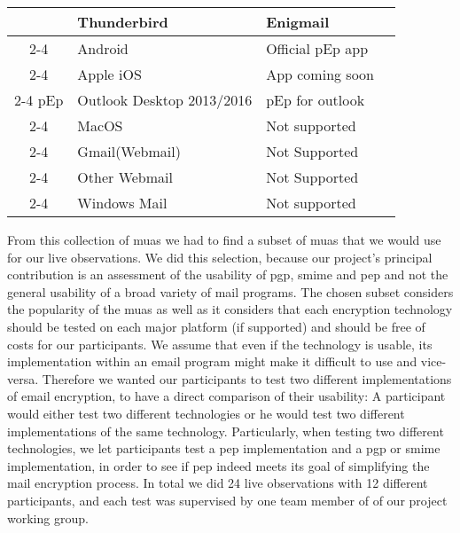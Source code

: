 {\begin{table*}
\begin{tabular}{|c|l|l|c|}
								& Thunderbird					& Enigmail						& \cmark	\\ \cline{2-4}
								& Android						& Official pEp app				& \cmark 	\\ \cline{2-4}
								& Apple iOS						& App coming soon				& \xmark	\\ \cline{2-4}
		{pEp}					& Outlook Desktop 2013/2016		& pEp for outlook    			& \xmark	\\ \cline{2-4}
								& MacOS							& Not supported         		& \xmark	\\ \cline{2-4}
								& Gmail(Webmail)				& Not Supported 				& \xmark	\\ \cline{2-4}
								& Other Webmail 				& Not Supported					& \xmark	\\ \cline{2-4}
								& Windows Mail					& Not supported					& \xmark 	\\ \hline 	
	\end{tabular}
	\caption{Commonly used mail user agents (MUA) and their support for \acrshort{pgp}, \acrshort{smime} and \acrshort{pep}} \label{tab:MailUserAgents}
\end{table*}
}
From this collection of \acrshort{mua}s we had to find a subset of \acrshort{mua}s that we would use for our live observations. We did this selection, because our project’s principal contribution is an assessment of the usability of \acrshort{pgp}, \acrshort{smime} and \acrshort{pep} and not the general usability of a broad variety of mail programs. The chosen subset considers the popularity of the \acrshort{mua}s as well as it considers that each encryption technology should be tested on each major platform (if supported) and should be free of costs for our participants. We assume that even if the technology is usable, its implementation within an \acrshort{email} program might make it difficult to use and vice-versa. Therefore we wanted our participants to test two
different implementations of \acrshort{email} encryption, to have a direct comparison of their usability:
\newline
A participant would either test two different technologies or he would test two different implementations of the same technology. Particularly, when testing two different technologies, we let participants test a \acrshort{pep} implementation and a \acrshort{pgp} or \acrshort{smime} implementation, in order to see if \acrshort{pep} indeed meets its goal of simplifying the mail encryption process.
In total we did 24 live observations with 12 different participants, and each test was supervised by one team member of of our project working group.
